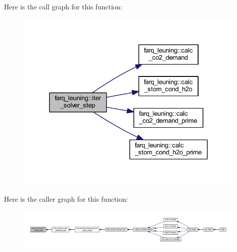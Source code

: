 Here is the call graph for this function\+:\nopagebreak
\begin{figure}[H]
\begin{center}
\leavevmode
\includegraphics[width=324pt]{namespacefarq__leuning_a0aaa5d6b54e5a9a9549d2c43bfbecf06_cgraph}
\end{center}
\end{figure}




Here is the caller graph for this function\+:\nopagebreak
\begin{figure}[H]
\begin{center}
\leavevmode
\includegraphics[width=350pt]{namespacefarq__leuning_a0aaa5d6b54e5a9a9549d2c43bfbecf06_icgraph}
\end{center}
\end{figure}


